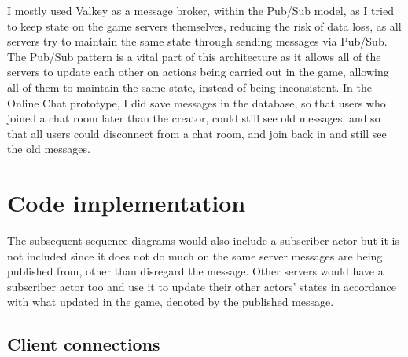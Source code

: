 \documentclass[]{final}
\begin{document}
\label{valkeyMessageBroker}

I mostly used Valkey as a message broker, within the Pub/Sub model, as I
tried to keep state on the game servers themselves, reducing the risk of data
loss, as all servers try to maintain the same state through sending messages
via Pub/Sub. The Pub/Sub pattern is a vital part of this architecture as it
allows all of the servers to update each other on actions being carried out
in the game, allowing all of them to maintain the same state,
instead of being inconsistent. In the Online Chat prototype,
I did save messages in the database, so that users who joined
a chat room later than the creator, could still see old messages, and so that all
users could disconnect from a chat room, and join back in and still see the old
messages.

\newpage

\section{Code implementation}

The subsequent sequence diagrams would also include a subscriber actor
but it is not included since it does not do much on the same server
messages are being published from, other than disregard the message.
Other servers would have a subscriber actor too and use it to update
their other actors' states in accordance with what updated in the game,
denoted by the published message.

\subsection{Client connections}
\end{document}
